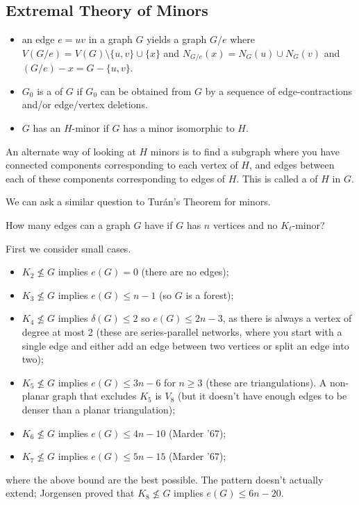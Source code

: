 \documentclass[main.tex]{subfiles}
\begin{document}
\subsection{Extremal Theory of Minors}
\begin{definition*}
  \listhack
  \begin{itemize}
    \item {} an edge $e = uv$ in a graph $G$
      yields a graph $G/e$ where $V(G/e) = V(G)\setminus\{u,v\}\cup\{x\}$
      and $N_{G/e}(x) = N_G(u)\cup N_G(v)$ and $(G/e) - x = G - \{u,v\}$.

    \item $G_0$ is a  of $G$ if $G_0$ can be obtained from $G$ by
      a sequence of edge-contractions and/or edge/vertex deletions.

    \item $G$ has an $H$-minor if $G$ has a minor isomorphic to $H$.
  \end{itemize}
\end{definition*}
An alternate way of looking at $H$ minors is to find a subgraph where you
have connected components corresponding to each vertex of $H$,
and edges between each of these components corresponding to edges of $H$.
This is called a  of $H$ in $G$.

We can ask a similar question to Tur\'an's Theorem for minors.
\begin{question*}
  How many edges can a graph $G$ have if $G$ has $n$ vertices and no $K_t$-minor?
\end{question*}
First we consider small cases.
\begin{itemize}
  \item $K_2\not\leq G$ implies $e(G) = 0$ (there are no edges);

  \item $K_3\not\leq G$ implies $e(G)\leq n-1$ (so $G$ is a forest);

  \item $K_4\not\leq G$ implies $\delta(G)\leq 2$ so $e(G)\leq 2n-3$,
    as there is always a vertex of degree at most 2
    (these are series-parallel networks,
    where you start with a single edge and either add an edge between two
    vertices or split an edge into two);

  \item $K_5\not\leq G$ implies $e(G)\leq 3n-6$ for $n\geq 3$
    (these are triangulations).
    A non-planar graph that excludes $K_5$ is $V_8$ (but it doesn't have enough
    edges to be denser than a planar triangulation);

  \item $K_6\not\leq G$ implies $e(G)\leq 4n - 10$ (Marder '67);

  \item $K_7\not\leq G$ implies $e(G)\leq 5n-15$ (Marder '67);
\end{itemize}
where the above bound are the best possible.
The pattern doesn't actually extend; Jorgensen proved that $K_8\not\leq G$
implies $e(G)\leq 6n-20$.
\end{document}
